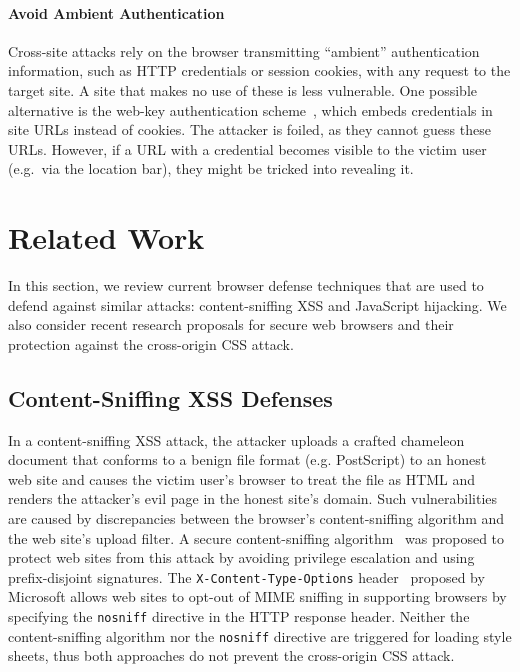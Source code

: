 \documentclass{acm_proc_article-sp}
\begin{document}
\paragraph{Avoid Ambient Authentication}
Cross-site attacks rely on the browser transmitting “ambient”
authentication information, such as HTTP credentials or session
cookies, with any request to the target site.  A site that makes no
use of these is less vulnerable.  One possible alternative is the
web-key authentication scheme~\cite{webkey}, which embeds credentials
in site URLs instead of cookies.  The attacker is foiled, as they
cannot guess these URLs.  However, if a URL with a credential becomes
visible to the victim user (e.g.\ via the location bar), they might be
tricked into revealing it.

\section{Related Work} \label{sec:relatedwork}
In this section, we review current browser defense techniques that are
used to defend against similar attacks: content-sniffing XSS and
JavaScript hijacking.  We also consider recent research proposals for
secure web browsers and their protection against the cross-origin CSS
attack.

\subsection{Content-Sniffing XSS Defenses}
In a content-sniffing XSS attack, the attacker uploads a crafted chameleon
document that conforms to a benign file format (e.g. PostScript) to an honest
web site and causes the victim user's browser to treat the file as HTML and
renders the attacker's evil page in the honest site's domain. Such
vulnerabilities are caused by discrepancies between the browser's
content-sniffing algorithm and the web site's upload filter. A secure
content-sniffing algorithm~\cite{securecontentsniffing} was proposed to
protect web sites from this attack by avoiding privilege escalation and using
prefix-disjoint signatures. The \texttt{X-Content-Type-Options}
header~\cite{nosniff} proposed by Microsoft allows web sites to opt-out of
MIME sniffing in supporting browsers by specifying the \texttt{nosniff}
directive in the HTTP response header. Neither the content-sniffing algorithm
nor the \texttt{nosniff} directive are triggered for loading style sheets,
thus both approaches do not prevent the cross-origin CSS attack.
\end{document}
